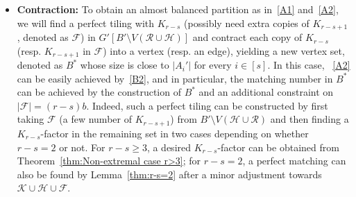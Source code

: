 \documentclass[11pt, a4paper]{article}
\theoremstyle{definition}
\newcommand{\<}{\subseteq}
\begin{document}
\begin{itemize}
    \item {\bf Contraction:} {%
    To obtain an almost balanced partition as in~\ref{A1} and~\ref{A2},}  we will find a perfect tiling with $K_{r-s}$ (possibly need extra copies of $K_{r-s+1}$, denoted as $\mathcal{F}$) in $G'[B'\setminus V(\mathcal{R}\cup\mathcal{H})]$ and contract each copy of $K_{r-s}$ (resp. $K_{r-s+1}$ in $\mathcal{F}$) into a vertex (resp. an edge), yielding a new vertex set, denoted as $B^*$ whose size is close to $|A_i'|$ for every $i\in[s]$. In this case, ~\ref{A2} can be easily achieved by~\ref{B2}, and in particular, the matching number in $B^*$ can be achieved by the construction of $B^*$ and an additional constraint on $|\mathcal{F}|=(r-s)b$. Indeed, such a perfect tiling can be constructed by first taking $\mathcal{F}$ (a few number of $K_{r-s+1}$) from $B'\setminus V(\mathcal{H}\cup \mathcal{R})$ and then finding a $K_{r-s}$-factor in the remaining set in two cases depending on whether $r-s=2$ or not. For $r-s\geq 3$, a desired $K_{r-s}$-factor can be obtained from Theorem~\ref{thm:Non-extremal case r>3}; for $r-s=2$, a perfect matching can also be found by Lemma~\ref{thm:r-s=2} after a minor adjustment towards $\mathcal{K}\cup \mathcal{H}\cup \mathcal{F}$. 
    
    
    
    
    
    
    




\end{itemize}
\end{document}
